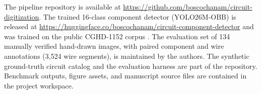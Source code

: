 The pipeline repository is available at \url{https://github.com/boscochanam/circuit-digitization}. The trained 16-class component detector (YOLO26M-OBB) is released at \url{https://huggingface.co/boscochanam/circuit-component-detector} and was trained on the public CGHD-1152 corpus \cite{Thoma2021}. The evaluation set of 134 manually verified hand-drawn images, with paired component and wire annotations (3{,}524 wire segments), is maintained by the authors. The synthetic ground-truth circuit catalog and the evaluation harness are part of the repository. Benchmark outputs, figure assets, and manuscript source files are contained in the project workspace.
